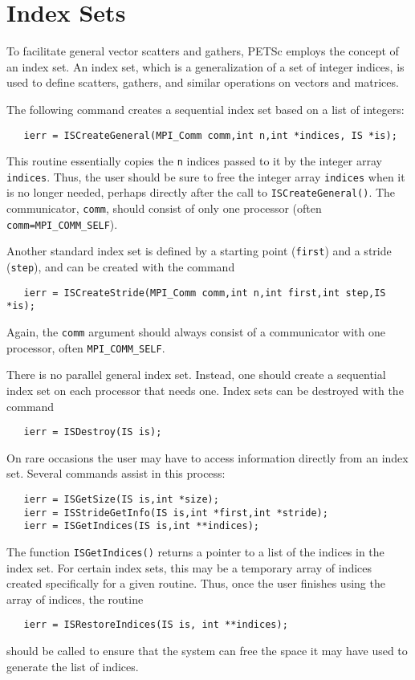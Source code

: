 \section{Index Sets} 
\label{sec:indexset}

To facilitate general vector scatters and gathers, PETSc employs the 
concept of an index set.  An index set, which is a generalization of a 
set of integer indices, is used to define scatters, gathers, and similar 
operations on vectors and matrices. 

The following command creates a sequential index set based on a list 
of integers: 
\begin{verbatim}
   ierr = ISCreateGeneral(MPI_Comm comm,int n,int *indices, IS *is);
\end{verbatim}
This routine essentially copies the {\tt n} indices passed 
to it by the integer array {\tt indices}.  
Thus, the user should be sure to free the integer array {\tt indices} 
when it is no longer needed, perhaps directly after the call to 
{\tt ISCreateGeneral()}. The communicator, {\tt comm}, should consist of only
one processor (often {\tt comm=MPI\_COMM\_SELF}).

Another standard index set is defined by a starting point ({\tt first}) and a
stride ({\tt step}),  and can be created with the command
\begin{verbatim}
   ierr = ISCreateStride(MPI_Comm comm,int n,int first,int step,IS *is);
\end{verbatim}
Again, the {\tt comm} argument should always consist of
a communicator with one processor, often {\tt MPI\_COMM\_SELF}.

There is no parallel general index set. Instead, one should create a sequential
index set on each processor that needs one.
Index sets can be destroyed with the command 
\begin{verbatim}
   ierr = ISDestroy(IS is); 
\end{verbatim}

On rare occasions the user may have to access information directly 
from an index set.  
Several commands  
assist in this process:
\begin{verbatim}
   ierr = ISGetSize(IS is,int *size);
   ierr = ISStrideGetInfo(IS is,int *first,int *stride);
   ierr = ISGetIndices(IS is,int **indices);
\end{verbatim}
The function {\tt ISGetIndices()} returns a pointer to a list of the 
indices in the index set. 
For certain index sets, this may be a 
temporary array of indices created specifically for a given routine. 
Thus, once the user finishes using the array of indices, 
the routine 
\begin{verbatim}
   ierr = ISRestoreIndices(IS is, int **indices); 
\end{verbatim}
should be called to ensure that the system can free the space it 
may have used to generate the list of indices.

